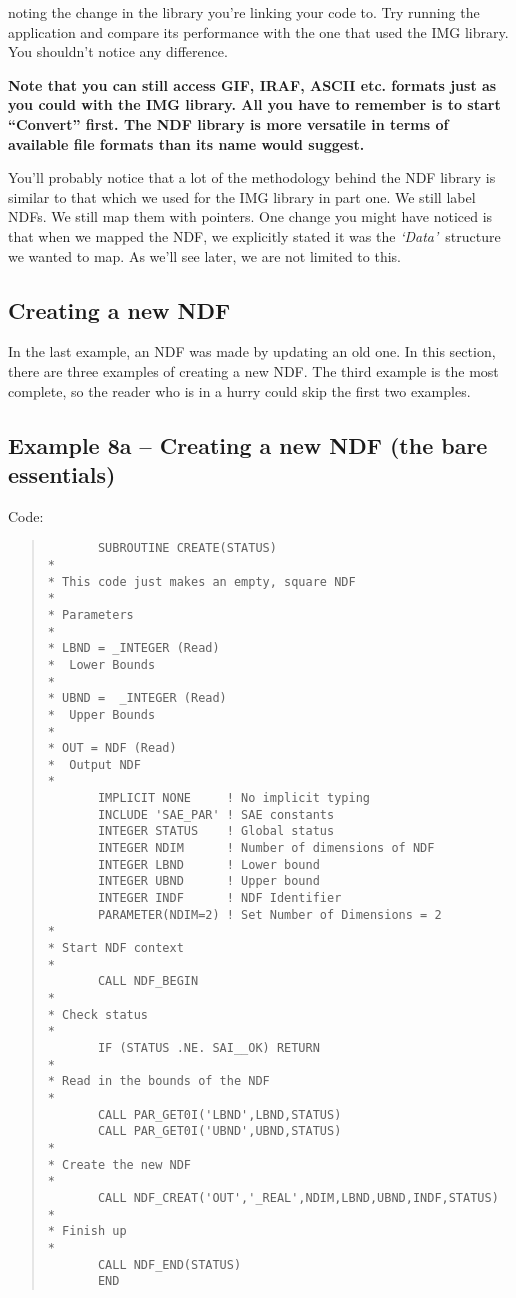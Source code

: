 noting the change in the library you're linking your code to. Try running
the application and compare its performance with the one that used the IMG
library. You shouldn't notice any difference.

{\bf Note that you can still access GIF, IRAF, ASCII etc. formats just as
you could with the IMG library. All you have to remember is to start
``Convert'' first. The NDF library is more versatile in terms of available
file formats than its name would suggest.}

You'll probably notice that a lot of the methodology behind the
NDF library is similar to that which we used for the IMG library in part one.
We still label NDFs. We still map them with pointers. One change you
might have noticed is that when we mapped the NDF, we explicitly stated
it was the {\em `Data'}\, structure we wanted to map. As we'll see
later, we are not limited to this.

\subsection{Creating a new NDF}

In the last example, an NDF was made by updating an old one. In this
section, there are three examples of creating a new NDF. The third
example is the most complete, so the reader who is in a hurry could
skip the first two examples.

\subsection{Example 8a -- Creating a new NDF (the bare essentials)}

Code:

\begin{quote}
{\small
\begin{verbatim}
       SUBROUTINE CREATE(STATUS)
*
* This code just makes an empty, square NDF
*
* Parameters
*
* LBND = _INTEGER (Read)
*  Lower Bounds
*
* UBND =  _INTEGER (Read)
*  Upper Bounds
*
* OUT = NDF (Read)
*  Output NDF
*
       IMPLICIT NONE     ! No implicit typing
       INCLUDE 'SAE_PAR' ! SAE constants
       INTEGER STATUS    ! Global status
       INTEGER NDIM      ! Number of dimensions of NDF
       INTEGER LBND      ! Lower bound
       INTEGER UBND      ! Upper bound
       INTEGER INDF      ! NDF Identifier
       PARAMETER(NDIM=2) ! Set Number of Dimensions = 2
*
* Start NDF context
*
       CALL NDF_BEGIN
*
* Check status
*
       IF (STATUS .NE. SAI__OK) RETURN
*
* Read in the bounds of the NDF
*
       CALL PAR_GET0I('LBND',LBND,STATUS)
       CALL PAR_GET0I('UBND',UBND,STATUS)
*
* Create the new NDF
*
       CALL NDF_CREAT('OUT','_REAL',NDIM,LBND,UBND,INDF,STATUS)
*
* Finish up
*
       CALL NDF_END(STATUS)
       END
\end{verbatim}
}
\end{quote}


